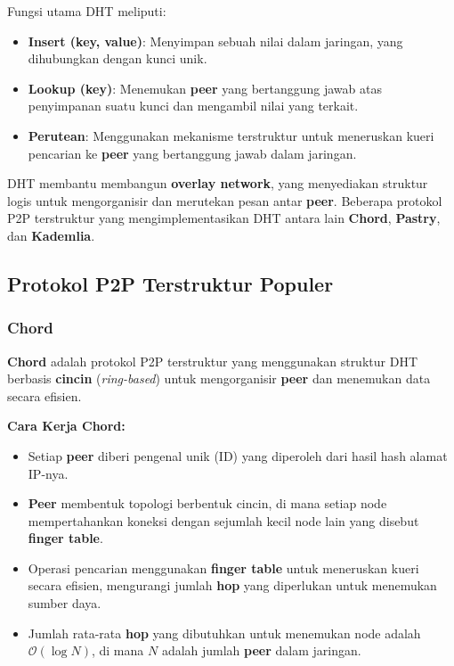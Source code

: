 Fungsi utama DHT meliputi:
\begin{itemize}
	\item \textbf{Insert (key, value)}: Menyimpan sebuah nilai dalam jaringan, yang dihubungkan dengan kunci unik.
	\item \textbf{Lookup (key)}: Menemukan \textbf{peer} yang bertanggung jawab atas penyimpanan suatu kunci dan mengambil nilai yang terkait.
	\item \textbf{Perutean}: Menggunakan mekanisme terstruktur untuk meneruskan kueri pencarian ke \textbf{peer} yang bertanggung jawab dalam jaringan.
\end{itemize}

DHT membantu membangun \textbf{overlay network}, yang menyediakan struktur logis untuk mengorganisir dan merutekan pesan antar \textbf{peer}. Beberapa protokol P2P terstruktur yang mengimplementasikan DHT antara lain \textbf{Chord}, \textbf{Pastry}, dan \textbf{Kademlia}.

\subsection{Protokol P2P Terstruktur Populer}

\subsubsection{Chord}
\textbf{Chord} adalah protokol P2P terstruktur yang menggunakan struktur DHT berbasis \textbf{cincin} (\textit{ring-based}) untuk mengorganisir \textbf{peer} dan menemukan data secara efisien.

\textbf{Cara Kerja Chord:}
\begin{itemize}
	\item Setiap \textbf{peer} diberi pengenal unik (ID) yang diperoleh dari hasil hash alamat IP-nya.
	\item \textbf{Peer} membentuk topologi berbentuk cincin, di mana setiap node mempertahankan koneksi dengan sejumlah kecil node lain yang disebut \textbf{finger table}.
	\item Operasi pencarian menggunakan \textbf{finger table} untuk meneruskan kueri secara efisien, mengurangi jumlah \textbf{hop} yang diperlukan untuk menemukan sumber daya.
	\item Jumlah rata-rata \textbf{hop} yang dibutuhkan untuk menemukan node adalah \textbf{\(\mathcal{O}(\log N)\)}, di mana \(N\) adalah jumlah \textbf{peer} dalam jaringan.
\end{itemize}

